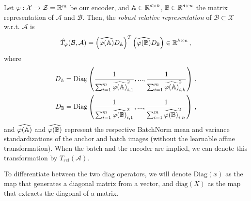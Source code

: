 \documentclass[../main.tex]{subfiles}
\begin{document}
\begin{definition}
Let $\varphi:\mathcal{X} \to \mathcal{Z}=\mathbb{R}^m$ be our encoder, and $\mathbb{A}\in \mathbb{R}^{d \times k}$, $\mathbb{B}\in \mathbb{R}^{d \times n}$ the matrix representation of $\mathcal{A}$ and $\mathcal{B}$. Then, the \emph{robust relative representation} of $\mathcal{B} \subset \mathcal{X}$ w.r.t. $\mathcal{A}$ is
\[
\hat{T}_\varphi(\mathcal{B}, \mathcal{A}) = \left(\widehat{\varphi(\mathbb{A})} D_{\mathbb{A}}\right)^T \left(\widehat{\varphi(\mathbb{B})} D_{\mathbb{B}}\right) \in \mathbb{R}^{k \times n}\,,
\]
where
\begin{gather*}
D_{\mathbb{A}} = \text{Diag}\left( \frac{1}{\sum_{i=1}^{m} \widehat{\varphi(\mathbb{A})}^2_{i,1}}, ...,       \frac{1}{\sum_{i=1}^{m} \widehat{\varphi(\mathbb{A})}^2_{i,k}} \right)\,,\\
D_{\mathbb{B}} = \text{Diag}\left( \frac{1}{\sum_{i=1}^{m} \widehat{\varphi(\mathbb{B})}^2_{i,1}}, ...,       \frac{1}{\sum_{i=1}^{m} \widehat{\varphi(\mathbb{B})}^2_{i,n}} \right)\,,
\end{gather*}
and $\widehat{\varphi(\mathbb{A})}$ and $\widehat{\varphi(\mathbb{B})}$ represent the respective BatchNorm mean and variance standardizations of the anchor and batch images (without the learnable affine transformation). When the batch and the encoder are implied, we can denote this transformation by $\hat{T}_{rel}(\mathcal{A})$.
\end{definition}

\begin{note}
To differentiate between the two $\text{diag}$ operators, we will denote $\text{Diag}(x)$ as the map that generates a diagonal matrix from a vector, and $\text{diag}(X)$ as the map that extracts the diagonal of a matrix.
\end{note}
\end{document}
